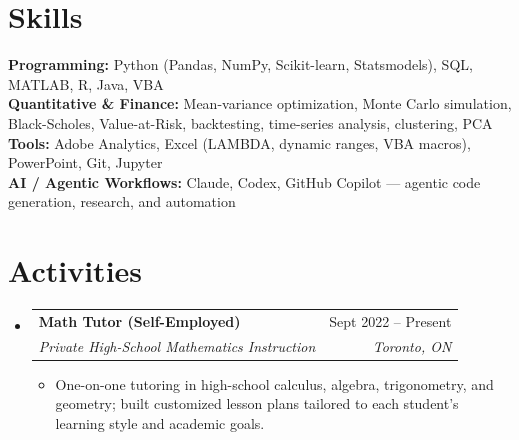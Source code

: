 \documentclass[letterpaper,11pt]{article}
\makeatletter
\newcommand{\resumeItem}[1]{%
  \item\small{#1 \vspace{-2pt}}
}
\newcommand{\resumeSubheading}[4]{%
  \needspace{5\baselineskip}%
  \vspace{-1pt}\item
    \begin{tabular*}{0.97\textwidth}[t]{l@{\extracolsep{\fill}}r}
      \textbf{#1} & {\small #2} \\
      \textit{\small#3} & \textit{\small #4} \\
    \end{tabular*}\vspace{-6pt}
}
\newcommand{\resumeSubHeadingListStart}{\begin{itemize}[leftmargin=0.15in, label={}]}
\newcommand{\resumeSubHeadingListEnd}{\end{itemize}}
\newcommand{\resumeItemListStart}{\begin{itemize}[itemsep=1pt, parsep=0pt, topsep=2pt]}
\newcommand{\resumeItemListEnd}{\end{itemize}\vspace{-4pt}}
\makeatother
\begin{document}
\section{Skills}
\begin{itemize}[leftmargin=0.15in, label={}]
    \small{\item{
        \textbf{Programming:} Python (Pandas, NumPy, Scikit-learn, Statsmodels), SQL, MATLAB, R, Java, VBA \\
        \textbf{Quantitative \& Finance:} Mean-variance optimization, Monte Carlo simulation, Black-Scholes, Value-at-Risk, backtesting, time-series analysis, clustering, PCA \\
        \textbf{Tools:} Adobe Analytics, Excel (LAMBDA, dynamic ranges, VBA macros), PowerPoint, Git, Jupyter \\
        \textbf{AI / Agentic Workflows:} Claude, Codex, GitHub Copilot --- agentic code generation, research, and automation
    }}
\end{itemize}


\section{Activities}
  \resumeSubHeadingListStart
    \resumeSubheading
      {Math Tutor (Self-Employed)}{Sept 2022 -- Present}
      {Private High-School Mathematics Instruction}{Toronto, ON}
      \resumeItemListStart
        \resumeItem{One-on-one tutoring in high-school calculus, algebra, trigonometry, and geometry; built customized lesson plans tailored to each student's learning style and academic goals.}
      \resumeItemListEnd
  \resumeSubHeadingListEnd
\end{document}
